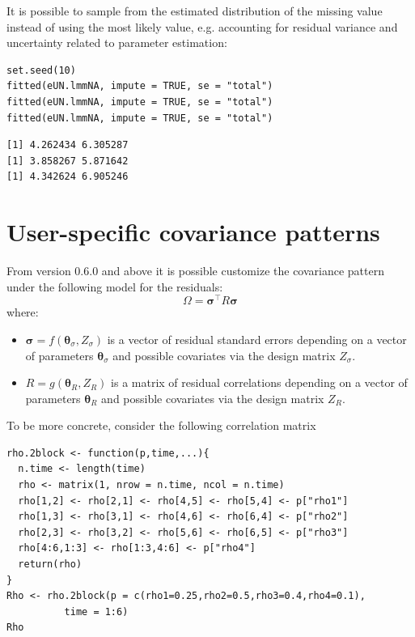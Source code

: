 \documentclass[12pt]{article}
\newcommand\trans[1]{{#1}^\intercal}%
\begin{document}
It is possible to sample from the estimated distribution of the
missing value instead of using the most likely value, e.g. accounting
for residual variance and uncertainty related to parameter estimation:
\lstset{language=r,label= ,caption= ,captionpos=b,numbers=none}
\begin{lstlisting}
set.seed(10)
fitted(eUN.lmmNA, impute = TRUE, se = "total")
fitted(eUN.lmmNA, impute = TRUE, se = "total")
fitted(eUN.lmmNA, impute = TRUE, se = "total")
\end{lstlisting}

\begin{verbatim}
[1] 4.262434 6.305287
[1] 3.858267 5.871642
[1] 4.342624 6.905246
\end{verbatim}


\clearpage

\section{User-specific covariance patterns}
\label{sec:org58205f0}

From version 0.6.0 and above it is possible customize the covariance
pattern under the following model for the residuals:
\[\Omega = \trans{\boldsymbol{\sigma}} R \boldsymbol{\sigma}\]
where:
\begin{itemize}
\item \(\boldsymbol{\sigma}=f(\boldsymbol{\theta}_{\sigma},Z_{\sigma})\)
is a vector of residual standard errors depending on a vector of
parameters \(\boldsymbol{\theta}_{\sigma}\) and possible covariates
via the design matrix \(Z_{\sigma}\).
\item \(R=g(\boldsymbol{\theta}_{R},Z_R)\) is a matrix of residual
correlations depending on a vector of parameters
\(\boldsymbol{\theta}_{R}\) and possible covariates via the design
matrix \(Z_R\).
\end{itemize}

\bigskip

To be more concrete, consider the following correlation matrix
\lstset{language=r,label= ,caption= ,captionpos=b,numbers=none}
\begin{lstlisting}
rho.2block <- function(p,time,...){
  n.time <- length(time)
  rho <- matrix(1, nrow = n.time, ncol = n.time)
  rho[1,2] <- rho[2,1] <- rho[4,5] <- rho[5,4] <- p["rho1"]
  rho[1,3] <- rho[3,1] <- rho[4,6] <- rho[6,4] <- p["rho2"]
  rho[2,3] <- rho[3,2] <- rho[5,6] <- rho[6,5] <- p["rho3"]
  rho[4:6,1:3] <- rho[1:3,4:6] <- p["rho4"]
  return(rho)
}
Rho <- rho.2block(p = c(rho1=0.25,rho2=0.5,rho3=0.4,rho4=0.1),
		  time = 1:6)
Rho
\end{lstlisting}
\end{document}
